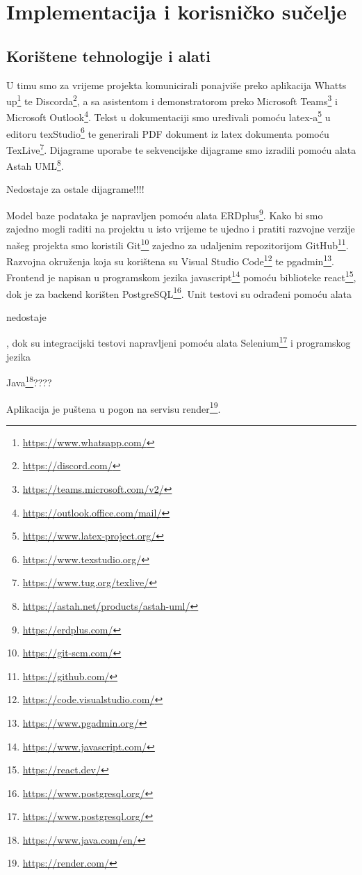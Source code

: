 \chapter{Implementacija i korisničko sučelje}
		
		
		\section{Korištene tehnologije i alati}

			 U timu smo za vrijeme projekta komunicirali ponajviše preko aplikacija Whatts up\footnote{\url{https://www.whatsapp.com/}} te Discorda\footnote{\url{https://discord.com/}}, a sa asistentom i demonstratorom preko Microsoft Teams\footnote{\url{https://teams.microsoft.com/v2/}} i Microsoft Outlook\footnote{\url{https://outlook.office.com/mail/}}. Tekst u dokumentaciji smo uređivali pomoću latex-a\footnote{\url{https://www.latex-project.org/}} u editoru texStudio\footnote{\url{https://www.texstudio.org/}} te generirali PDF dokument iz latex dokumenta pomoću TexLive\footnote{\url{https://www.tug.org/texlive/}}. Dijagrame uporabe te sekvencijske dijagrame smo izradili pomoću alata Astah UML\footnote{\url{https://astah.net/products/astah-uml/}}.
			 
			 Nedostaje za ostale dijagrame!!!!
			 
			 Model baze podataka je napravljen pomoću alata ERDplus\footnote{\url{https://erdplus.com/}}. Kako bi smo zajedno mogli raditi na projektu u isto vrijeme te ujedno i pratiti razvojne verzije našeg projekta smo koristili Git\footnote{\url{https://git-scm.com/}} zajedno za udaljenim repozitorijom GitHub\footnote{\url{https://github.com/}}. Razvojna okruženja koja su korištena su Visual Studio Code\footnote{\url{https://code.visualstudio.com/}} te pgadmin\footnote{\url{https://www.pgadmin.org/}}. Frontend je napisan u programskom jezika javascript\footnote{\url{https://www.javascript.com/}} pomoću biblioteke react\footnote{\url{https://react.dev/}}, dok je za backend korišten PostgreSQL\footnote{\url{https://www.postgresql.org/}}. Unit testovi su odrađeni pomoću alata
			 
			 nedostaje
			 
			 , dok su integracijski testovi napravljeni pomoću alata Selenium\footnote{\url{https://www.postgresql.org/}} i programskog  jezika
			 
			 Java\footnote{\url{https://www.java.com/en/}}????
			 
			 Aplikacija je puštena u pogon na servisu render\footnote{\url{https://render.com/}}.
			 
